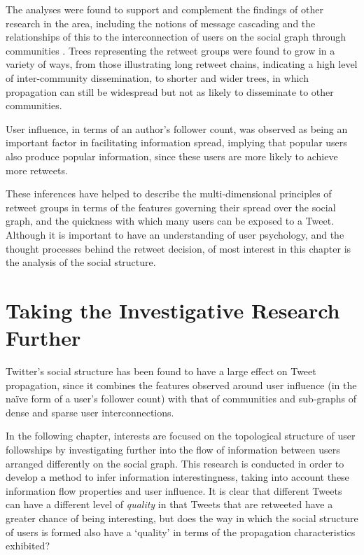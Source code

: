 The analyses were found to support and complement the findings of other research in the area, including the notions of message cascading \cite{galuba10} and the relationships of this to the interconnection of users on the social graph through communities \cite{java07}. Trees representing the retweet groups were found to grow in a variety of ways, from those illustrating long retweet chains, indicating a high level of inter-community dissemination, to shorter and wider trees, in which propagation can still be widespread but not as likely to disseminate to other communities.

User influence, in terms of an author's follower count, was observed as being an important factor in facilitating information spread, implying that popular users also produce popular information, since these users are more likely to achieve more retweets.

These inferences have helped to describe the multi-dimensional principles of retweet groups in terms of the features governing their spread over the social graph, and the quickness with which many users can be exposed to a Tweet. Although it is important to have an understanding of user psychology, and the thought processes behind the retweet decision, of most interest in this chapter is the analysis of the social structure.


\section{Taking the Investigative Research Further}
Twitter's social structure has been found to have a large effect on Tweet propagation, since it combines the features observed around user influence (in the na{\"i}ve form of a user's follower count) with that of communities and sub-graphs of dense and sparse user interconnections.

In the following chapter, interests are focused on the topological structure of user followships by investigating further into the flow of information between users arranged differently on the social graph. This research is conducted in order to develop a method to infer information interestingness, taking into account these information flow properties and user influence. It is clear that different Tweets can have a different level of \textit{quality} in that Tweets that are retweeted have a greater chance of being interesting, but does the way in which the social structure of users is formed also have a `quality' in terms of the propagation characteristics exhibited?
